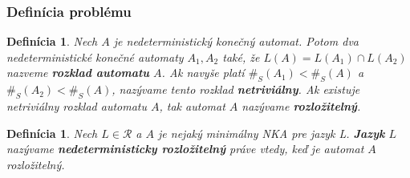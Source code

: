 \documentclass[notheorems]{beamer}
\newtheorem{definition}[theorem]{Definícia}
\begin{document}
\begin{frame}
\frametitle{Definícia problému}

\begin{definition}
Nech $ A $ je nedeterministický konečný automat. Potom dva nedeterministické konečné automaty $ A_1, A_2 $ také, že $ L(A)=L(A_1) \cap L(A_2) $ nazveme \textbf{rozklad automatu} $ A $. Ak navyše platí $ \#_S(A_1) < \#_S(A)$ a $ \#_S(A_2) < \#_S(A) $, nazývame tento rozklad \textbf{netriviálny}. Ak existuje netriviálny rozklad automatu $ A $, tak automat $ A $ nazývame \textbf{rozložitelný}.
\end{definition}

\begin{definition}
\label{def:nedeterministic_decomposability_of_language}
Nech $ L \in \mathscr{R} $ a $ A $ je nejaký minimálny NKA pre jazyk L. \textbf{Jazyk} $ L $ nazývame \textbf{nedeterministicky rozložitelný} práve vtedy, keď je automat $ A $ rozložitelný.
\end{definition}

\end{frame}
\end{document}
